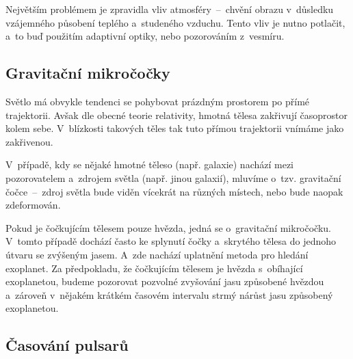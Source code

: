 \documentclass[a4paper,12pt]{article}
\begin{document}
{{{Největším problémem je zpravidla vliv atmosféry~--~chvění obrazu v~důsledku vzájemného působení teplého a~studeného vzduchu. Tento vliv je nutno potlačit, a~to buď použitím adaptivní optiky, nebo pozorováním z~vesmíru.~\cite{methods}


\vspace{-10pt}
\subsection{Gravitační mikročočky}

Světlo má obvykle tendenci se pohybovat prázdným prostorem po přímé trajektorii. Avšak dle obecné teorie relativity, hmotná tělesa zakřivují časoprostor kolem sebe. V~blízkosti takových těles tak tuto přímou trajektorii vnímáme jako zakřivenou.~\cite{methods}


{}

V~případě, kdy se nějaké hmotné těleso (např. galaxie) nachází mezi pozorovatelem a~zdrojem světla (např. jinou galaxií), mluvíme o~tzv. gravitační čočce~--~zdroj světla bude viděn vícekrát na různých místech, nebo bude naopak zdeformován.~\cite{methods}


Pokud je čočkujícím tělesem pouze hvězda, jedná se o~gravitační mikročočku. V~tomto případě dochází často ke splynutí čočky a~skrytého tělesa do jednoho útvaru se zvýšeným jasem. A~zde nachází uplatnění metoda pro hledání exoplanet. Za předpokladu, že čočkujícím tělesem je hvězda s~obíhající exoplanetou, budeme pozorovat pozvolné zvyšování jasu způsobené hvězdou a~zároveň v~nějakém krátkém časovém intervalu strmý nárůst jasu způsobený exoplanetou.~\cite{methods}

\subsection{Časování pulsarů}

}}}
\end{document}
